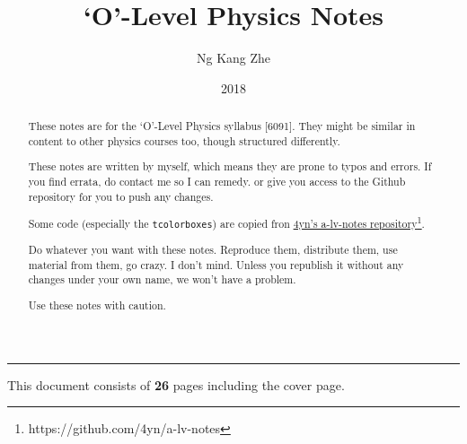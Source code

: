 \documentclass[a4paper,10pt]{article}
\title{`O'-Level Physics Notes}
\author{Ng Kang Zhe}
\date{2018}
\begin{document}
\maketitle

\begin{abstract}
	These notes are for the `O'-Level Physics syllabus [6091]. They might be similar in content to other physics courses too, though structured differently.
	
	These notes are written by myself, which means they are prone to typos and errors. If you find errata, do contact me so I can remedy. or give you access to the Github repository for you to push any changes.
	
	Some code (especially the \texttt{tcolorboxes}) are copied fron \href{https://github.com/4yn/a-lv-notes}{\color{blue} \underline{4yn's a-lv-notes repository\footnote{https://github.com/4yn/a-lv-notes}}}.
	
	Do whatever you want with these notes. Reproduce them, distribute them, use material from them, go crazy. I don't mind. Unless you republish it without any changes under your own name, we won't have a problem.
	
	Use these notes with caution.
\end{abstract}

\begin{multicols}{2}
\tableofcontents
\end{multicols}

\vspace*{\fill}
\hrule
\begin{center}
	This document consists of \textbf{26} pages including the cover page.
\end{center}
\end{document}
